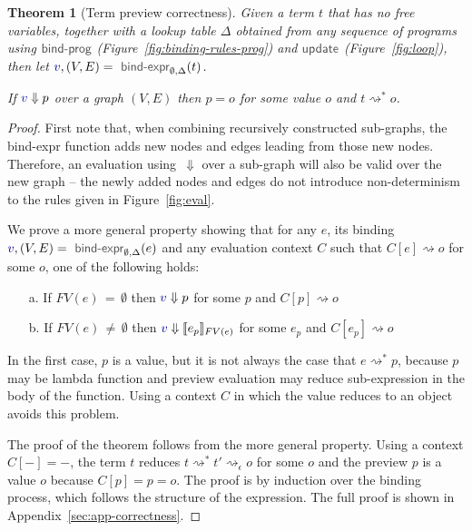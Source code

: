 \documentclass[acmsmall,anonymous,fleqn]{acmart}\settopmatter{printfolios=false,printccs=false,printacmref=false}
\newcounter{thc}
\theoremstyle{plain}
\newtheorem{theorem}[thc]{Theorem}
\theoremstyle{definition}
\newcommand{\ident}[1]{\textnormal{\textcolor{idclr}{\sffamily #1}}}
\newcommand{\bndclr}[1]{\textcolor{kvdclr}{#1}}
\begin{document}
\begin{theorem}[Term preview correctness]
\label{thm:let-free-correct}
Given a term $t$ that has no free variables, together with a lookup table $\Delta$ obtained
from any sequence of programs using $\ident{bind-prog}$ (Figure~\ref{fig:binding-rules-prog}) and
$\ident{update}$ (Figure~\ref{fig:loop}), then
let $\bndclr{v}, (V, E) = \ident{bind-expr}_{\emptyset, \Delta}(t)$.

\vspace{0.25em}
\noindent
If $\bndclr{v}\Downarrow p$
over a graph $(V, E)$ then $p = o$ for some value $o$ and $t \rightsquigarrow^{*} o$.
\end{theorem}

\begin{proof}
First note that, when combining recursively constructed sub-graphs, the \ident{bind-expr} function
adds new nodes and edges leading from those new nodes. Therefore, an evaluation using~$\Downarrow$
over a sub-graph will also be valid over the new graph -- the newly added nodes and edges do not introduce
non-determinism to the rules given in Figure~\ref{fig:eval}.

We prove a more general property showing that for any $e$, its binding
$\bndclr{v}, (V, E) = \ident{bind-expr}_{\emptyset, \Delta}(e)$ and any evaluation context $C$
such that $C[e]\rightsquigarrow o$ for some $o$, one of the following holds:
%
\begin{enumerate}
\item[a.] If $FV(e)\,=\,\emptyset$ then $\bndclr{v} \Downarrow p$ for some $p$ and $C[p] \rightsquigarrow o$
\item[b.] If $FV(e)\,\neq\,\emptyset$ then $\bndclr{v} \Downarrow \llbracket e_p \rrbracket_{FV(e)}$ for some $e_p$ and $C[e_p] \rightsquigarrow o$
\end{enumerate}
%
In the first case, $p$ is a value, but it is not always the case that $e \rightsquigarrow^{*} p$,
because $p$ may be lambda function and preview evaluation may reduce sub-expression in the body of
the function. Using a context $C$ in which the value reduces to an object avoids this problem.

The proof of the theorem follows from the more general property. Using a context $C[-]=-$, the
term $t$ reduces $t \rightsquigarrow^{*}t' \rightsquigarrow_\epsilon o$ for some $o$ and the
preview $p$ is a value $o$ because $C[p] = p = o$.
The proof is by induction over the binding process, which follows the structure of the expression.
The full proof is shown in Appendix~\ref{sec:app-correctness}.
\end{proof}
\end{document}
